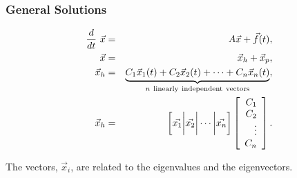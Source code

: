 \begin{frame}
  \frametitle{General Solutions}

  \begin{eqnarray*}
    \deriv{~}{t} \vec{x}  & = & A \vec{x} + \vec{f}(t), \\
    \vec{x} & = & \vec{x}_h + \vec{x}_p, \\
    \vec{x}_h & = & \underbrace{C_1 \vec{x}_1(t) + C_2 \vec{x}_2(t) + \cdots + C_n \vec{x}_n(t)}_{n~\mathrm{linearly~independent~vectors}}, \\
    \vec{x}_h & = & \left[ \vec{x_1} \bigg| \vec{x_2} \bigg| \cdots \bigg| \vec{x_n} \right]
    \left[
      \begin{array}{rr}
        C_1 \\ C_2 \\ \vdots \\ C_n
      \end{array}
    \right].
  \end{eqnarray*}

  The vectors, $\vec{x}_i$, are related to the eigenvalues and the eigenvectors.

\end{frame}
